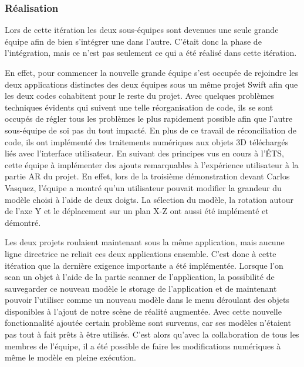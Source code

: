\documentclass[rapport.tex]{subfiles}
\begin{document}
\subsubsection*{Réalisation}
Lors de cette itération les deux sous-équipes sont devenues une seule grande équipe afin de bien s’intégrer une dans l’autre. C’était donc la phase de l'intégration, mais ce n’est pas seulement ce qui a été réalisé dans cette itération.
\par
En effet, pour commencer la nouvelle grande équipe s’est occupée de rejoindre les deux applications distinctes des deux équipes sous un même projet Swift afin que les deux codes cohabitent pour le reste du projet. Avec quelques problèmes techniques évidents qui suivent une telle réorganisation de code, ils se sont occupés de régler tous les problèmes le plus rapidement possible afin que l’autre sous-équipe de soi pas du tout impacté. En plus de ce travail de réconciliation de code, ils ont implémenté des traitements numériques aux objets 3D téléchargés liés avec l’interface utilisateur. En suivant des principes vus en cours à l’ÉTS, cette équipe à implémenter des ajouts remarquables à l’expérience utilisateur à la partie AR du projet. En effet, lors de la troisième démonstration devant Carlos Vasquez, l’équipe a montré qu’un utilisateur pouvait modifier la grandeur du modèle choisi à l’aide de deux doigts. La sélection du modèle, la rotation autour de l’axe Y et le déplacement sur un plan X-Z ont aussi été implémenté et démontré.
\par
Les deux projets roulaient maintenant sous la même application, mais aucune ligne directrice ne reliait ces deux applications ensemble. C’est donc à cette itération que la dernière exigence importante a été implémentée. Lorsque l’on scan un objet à l’aide de la partie scanner de l’application, la possibilité de sauvegarder ce nouveau modèle le storage de l’application et de maintenant pouvoir l’utiliser comme un nouveau modèle dans le menu déroulant des objets disponibles à l’ajout de notre scène de réalité augmentée. Avec cette nouvelle fonctionnalité ajoutée certain problème sont survenus, car ses modèles n’étaient pas tout à fait prêts à être utilisés. C’est alors qu’avec la collaboration de tous les membres de l’équipe, il a été possible de faire les modifications numériques à même le modèle en pleine exécution.
\end{document}
